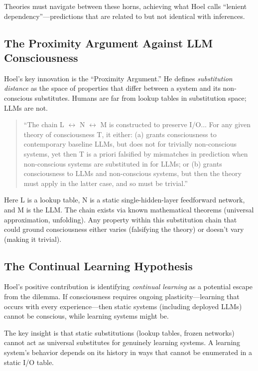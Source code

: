 Theories must navigate between these horns, achieving what Hoel calls ``lenient dependency''---predictions that are related to but not identical with inferences.

\subsection{The Proximity Argument Against LLM Consciousness}

Hoel's key innovation is the ``Proximity Argument.'' He defines \emph{substitution distance} as the space of properties that differ between a system and its non-conscious substitutes. Humans are far from lookup tables in substitution space; LLMs are not.

\begin{quote}
``The chain L $\leftrightarrow$ N $\leftrightarrow$ M is constructed to preserve I/O... For any given theory of consciousness T, it either: (a) grants consciousness to contemporary baseline LLMs, but does not for trivially non-conscious systems, yet then T is a priori falsified by mismatches in prediction when non-conscious systems are substituted in for LLMs; or (b) grants consciousness to LLMs and non-conscious systems, but then the theory must apply in the latter case, and so must be trivial.''~\citep[p.~13]{hoel2025disproof}
\end{quote}

Here L is a lookup table, N is a static single-hidden-layer feedforward network, and M is the LLM. The chain exists via known mathematical theorems (universal approximation, unfolding). Any property within this substitution chain that could ground consciousness either varies (falsifying the theory) or doesn't vary (making it trivial).

\subsection{The Continual Learning Hypothesis}

Hoel's positive contribution is identifying \emph{continual learning} as a potential escape from the dilemma. If consciousness requires ongoing plasticity---learning that occurs with every experience---then static systems (including deployed LLMs) cannot be conscious, while learning systems might be.

The key insight is that static substitutions (lookup tables, frozen networks) cannot act as universal substitutes for genuinely learning systems. A learning system's behavior depends on its history in ways that cannot be enumerated in a static I/O table.

